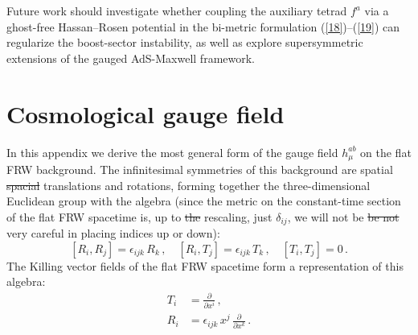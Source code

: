 \documentclass[11pt, a4paper]{article}
\newcommand{\lang}[1]{\textcolor{langfix}{#1}}
\newcommand{\subst}[1]{\textcolor{substantive}{#1}}
\newcommand{\rem}[1]{\textcolor{removeprop}{\sout{#1}}}
\begin{document}
\subst{Future work should investigate whether coupling the auxiliary tetrad $f^a$ via a ghost-free Hassan--Rosen potential in the bi-metric formulation (\ref{18})--(\ref{19}) can regularize the boost-sector instability, as well as explore supersymmetric extensions of the gauged AdS-Maxwell framework.}

\appendix
\section{Cosmological gauge field}

In this appendix we derive the most general form of the gauge field $h_\mu^{ab}$ on the flat FRW background. The infinitesimal symmetries of this background are \lang{spatial} \rem{spacial} translations and rotations, forming together the three-dimensional Euclidean group with the algebra (since the metric on the constant-time section of the flat FRW spacetime is, up to \rem{the} rescaling, just $\delta_{ij}$, we will \lang{not be} \rem{be not} very careful in placing indices up or down):
\begin{equation}\label{a1}
[R_i, R_j] = \epsilon_{ijk}\, R_k\,, \quad [R_i, T_j] = \epsilon_{ijk}\, T_k\,, \quad [T_i, T_j] = 0\, .
\end{equation}
The Killing vector fields of the flat FRW spacetime form a representation of this algebra:
\begin{align}
T_i &= \frac{\partial}{\partial x^i}\,,\nonumber \\
R_i &= \epsilon_{ijk}\, x^j \,\frac{\partial}{\partial x^k}\,.\label{a2}
\end{align}
\end{document}
